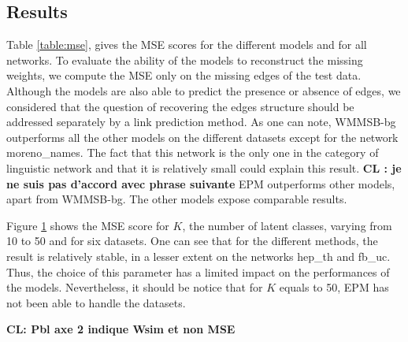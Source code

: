 \begin{table*}[t]
\centering
	
\label{table:mse}
\end{table*}

\subsection{Results}



Table \ref{table:mse}, gives the MSE scores for the different models and for all networks. To evaluate the ability of the models to reconstruct the missing weights, we compute the MSE only on the missing edges of the test data. Although the models are also able to predict the presence or absence of edges,  we considered that the question of recovering the edges structure should be addressed separately by a link prediction method. 
As one can note, WMMSB-bg outperforms all the other models on the different datasets except for the network moreno\_names. 
The fact that this network is the only one in the category of linguistic network and that it is relatively small could explain this result. \textbf{CL : je ne suis pas d'accord avec phrase suivante} EPM outperforms other models, apart from WMMSB-bg. The other models expose comparable results.

 

\begin{figure}[h]
\centering
	
   \label{fig:k_evolv}
\end{figure}
Figure \ref{fig:k_evolv} shows the MSE score for $K$, the number of latent classes, varying from 10 to 50 and for six datasets. One can see that for the different methods, the result is relatively stable, in a lesser extent on the networks hep\_th and fb\_uc. Thus, the choice of this parameter has a limited impact on the performances of the models. Nevertheless, it should be notice that for $K$ equals  to 50, EPM has not been able to handle the datasets.

\textbf{CL: Pbl axe 2 indique Wsim et non MSE}

